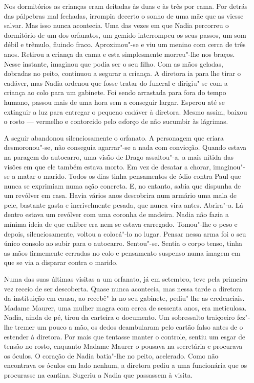 Nos dormitórios as crianças eram deitadas às duas e às três por cama.
Por detrás das pálpebras mal fechadas, irrompia decerto o sonho de uma
mãe que as viesse salvar. Mas isso nunca acontecia. Uma das vezes em que
Nadia percorreu o dormitório de um dos orfanatos, um gemido interrompeu
os seus passos, um som débil e trêmulo, fluindo fraco. Aproximou"-se e
viu um menino com cerca de três anos. Retirou a criança da cama e esta
simplesmente morreu"-lhe nos braços. Nesse instante, imaginou que podia
ser o seu filho. Com as mãos geladas, dobradas no peito, continuou a
segurar a criança. A diretora ia para lhe tirar o cadáver, mas Nadia
ordenou que fosse tratar do funeral e dirigiu"-se com a criança ao colo
para um gabinete. Foi sendo arrastada para fora do tempo humano,
passou mais de uma hora sem a conseguir largar. Esperou até se extinguir
a luz para entregar o pequeno cadáver à diretora. Mesmo assim, baixou o
rosto --- vermelho e contorcido pelo esforço de não sucumbir às lágrimas.

A seguir abandonou silenciosamente o orfanato. A personagem que criara desmoronou"-se, não conseguia agarrar"-se a nada com
convicção. Quando estava na paragem do autocarro, uma visão de Drago
assaltou"-a, a mais
nítida das visões em que ele também estava morto. Em vez de desatar a
chorar, imaginou"-se a matar o marido. Todos os dias tinha pensamentos de
ódio contra Paul que nunca se exprimiam numa ação concreta. E, no
entanto, sabia que dispunha de um revólver em casa. Havia vários anos
descobrira num armário uma mala de pele, bastante gasta e incrivelmente
pesada, que nunca vira antes. Abrira"-a. Lá dentro estava um revólver com
uma coronha de madeira. Nadia não fazia a mínima ideia de que calibre
era nem se estava carregado. Tomou"-lhe o peso e depois, silenciosamente, voltou a colocá"-lo no lugar. Pensar nessa arma foi o seu único
consolo ao subir para o autocarro. Sentou"-se. Sentia o corpo tenso,
tinha as mãos firmemente cerradas no colo e pensamento suspenso numa
imagem em que se via a disparar contra o marido.

Numa das suas últimas visitas a um orfanato, já em
setembro, teve pela primeira vez receio de ser descoberta. Quase nunca
acontecia, mas nessa tarde a diretora da instituição em causa, ao
recebê"-la no seu gabinete, pediu"-lhe as credenciais. Madame Maurer, uma
mulher magra com cerca de sessenta anos, era meticulosa. Nadia, ainda de
pé, tirou da carteira o documento. Um sobressalto traiçoeiro fez"-lhe
tremer um pouco a mão, os dedos deambularam pelo cartão falso antes de o
estender à diretora. Por mais que tentasse manter o controle, sentiu um
esgar de tensão no rosto, enquanto Madame Maurer o pousava na secretária e procurava os óculos. O coração de Nadia batia"-lhe no peito,
acelerado. Como não encontrava os óculos em lado nenhum, a diretora
pediu a uma funcionária que os procurasse na cantina. Sugeriu a Nadia
que passassem à visita.

